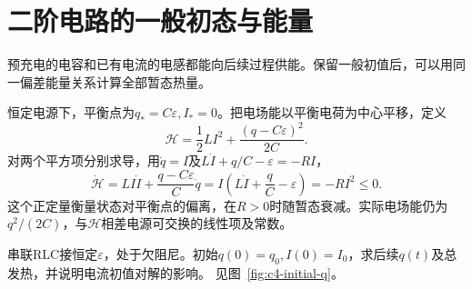 \section{二阶电路的一般初态与能量}
预充电的电容和已有电流的电感都能向后续过程供能。保留一般初值后，可以用同一偏差能量关系计算全部暂态热量。

恒定电源下，平衡点为$q_*=C\varepsilon,I_*=0$。把电场能以平衡电荷为中心平移，定义
\[
 \mathcal H=\frac12LI^2+\frac{(q-C\varepsilon)^2}{2C}.
\]
对两个平方项分别求导，用$\dot q=I$及$L\dot I+q/C-\varepsilon=-RI$，
\[\dot{\mathcal H}=LI\dot I+\frac{q-C\varepsilon}{C}\dot q
=I\left(L\dot I+\frac qC-\varepsilon\right)=-RI^2\le0.\]
这个正定量衡量状态对平衡点的偏离，在$R>0$时随暂态衰减。实际电场能仍为$q^2/(2C)$，与$\mathcal H$相差电源可交换的线性项及常数。

\begin{example}[有预充电和初始电流的欠阻尼电路]\label{ex:c4-initial}
串联RLC接恒定$\varepsilon$，处于欠阻尼。初始$q(0)=q_0,I(0)=I_0$，求后续$q(t)$及总发热，并说明电流初值对解的影响。 见图~\ref{fig:c4-initial-q}。
\end{example}

